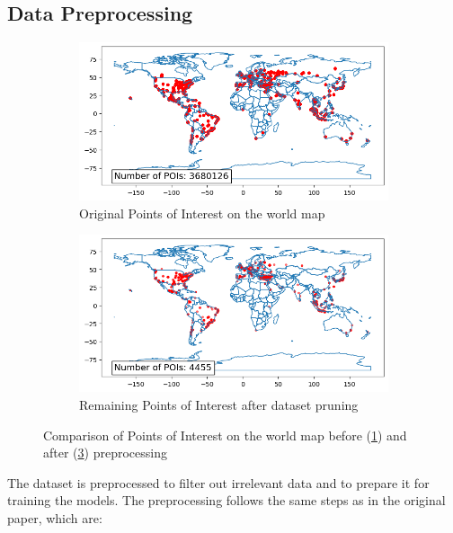 \documentclass[twocolumn,twoside]{article}
\begin{document}
\subsection{Data Preprocessing}
\label{ssec:data_preprocessing}
\begin{figure}[ht]
  \centering
  \begin{subfigure}[b]{0.95\linewidth}
    \centering
    \includegraphics[width=\linewidth]{poi_original.png}
    \caption{Original Points of Interest on the world map}
    \label{fig:data}
  \end{subfigure}
  \hfill
  \begin{subfigure}[b]{0.95\linewidth}
    \centering
    \includegraphics[width=\linewidth]{poi_after_processing.png}
    \caption{Remaining Points of Interest after dataset pruning}
    \label{fig:preprocessed_data}
  \end{subfigure}
  \caption{Comparison of Points of Interest on the world map before (\cref{fig:data}) and after (\cref{fig:preprocessed_data}) preprocessing}
\end{figure}
The dataset is preprocessed to filter out irrelevant data and to prepare
 it for training the models.
The preprocessing follows the same steps as in the original paper, which are:
\end{document}
